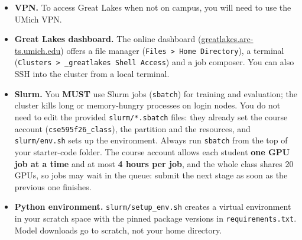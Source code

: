 \documentclass[11pt]{article}
\newcommand{\file}[1]{\texttt{#1}}
\begin{document}
\begin{itemize}
  \item \textbf{VPN.} To access Great Lakes when not on campus, you will need to use the UMich VPN.
  \item \textbf{Great Lakes dashboard.} The online dashboard
        (\href{https://greatlakes.arc-ts.umich.edu}{greatlakes.arc-ts.umich.edu}) offers a file manager
        (\texttt{Files > Home Directory}), a terminal (\texttt{Clusters > \_greatlakes Shell Access}) and a job
        composer. You can also SSH into the cluster from a local terminal.
  \item \textbf{Slurm.} You \textbf{MUST} use Slurm jobs (\texttt{sbatch}) for training and evaluation; the cluster
        kills long or memory-hungry processes on login nodes. You do not need to edit the provided
        \file{slurm/*.sbatch} files: they already set the course account (\texttt{cse595f26\_class}), the partition
        and the resources, and \file{slurm/env.sh} sets up the environment. Always run \texttt{sbatch} from the top
        of your starter-code folder. The course account allows each student \textbf{one GPU job at a time} and at
        most \textbf{4 hours per job}, and the whole class shares 20 GPUs, so jobs may wait in the queue: submit
        the next stage as soon as the previous one finishes.
  \item \textbf{Python environment.} \file{slurm/setup\_env.sh} creates a virtual environment in your scratch
        space with the pinned package versions in \file{requirements.txt}. Model downloads go to scratch, not
        your home directory.
\end{itemize}
\end{document}
